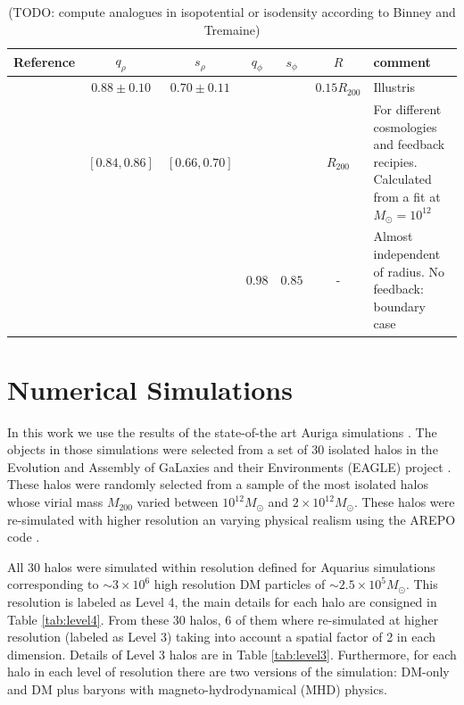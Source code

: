 \documentclass[a4paper,fleqn,usenatbib]{mnras}
\begin{document}
\begin{table}
\begin{tabular}{|l|cc|cc|c|p{4cm}|}\hline
Reference&$q_{\rho}$&$s_{\rho}$&$q_{\phi}$&$s_{\phi}$&$R$&comment\\ \hline \hline
\citet{Chua_et_al._2018}&$\mathbf{0.88\pm0.10}$&$\mathbf{0.70\pm0.11}$&&&$0.15R_{200}$& Illustris\\\hline
%
\citet{Bryan_et_al._2013}&$\mathbf{[0.84,0.86]}$&$\mathbf{[0.66,0.70]}$&&&$R_{200}$& For different cosmologies and feedback recipies. Calculated from a fit at $M_\odot=10^12$\\\hline
%
\multirow{2}{*}{\citet{Abadi_et_al._2010}}&&&$\mathbf{0.98}$&$\mathbf{0.85}$&-& Almost independent of radius. No feedback: boundary case\\\hline
\end{tabular}
\caption{(TODO: compute analogues in isopotential or isodensity according to Binney and Tremaine)}
\end{table}




\section{Numerical Simulations}

In this work we use the results of the state-of-the art Auriga
simulations \citep{auriga}. 
The objects in those simulations were selected from a set of 30
isolated halos in the Evolution and Assembly of GaLaxies and their
Environments (EAGLE)  project \citep{Eagle}.   
These halos were randomly selected from a sample of the most isolated
halos whose virial mass $M_{200}$ varied between $10^{12}M_\odot$ and
$2\times 10^{12}M_\odot$. 
These halos were re-simulated with higher resolution an varying
physical realism using the AREPO code \citep{arepo}.
 
All 30 halos were simulated within resolution defined for Aquarius
simulations corresponding to $\sim 3\times 10^6$ high resolution DM
particles of $\sim 2.5 \times 10^5 M_\odot$.  
This resolution is labeled as Level 4, the main details for each halo
are consigned in Table \ref{tab:level4}. 
From these 30 halos, 6 of them where re-simulated at higher resolution
(labeled as Level 3) taking into account a spatial factor of 2 in each
dimension.   
Details of Level 3 halos are in Table \ref{tab:level3}. 
Furthermore, for each halo in each level of resolution there are two
versions of the simulation: DM-only and DM plus baryons with
magneto-hydrodynamical (MHD) physics.  
\end{document}
